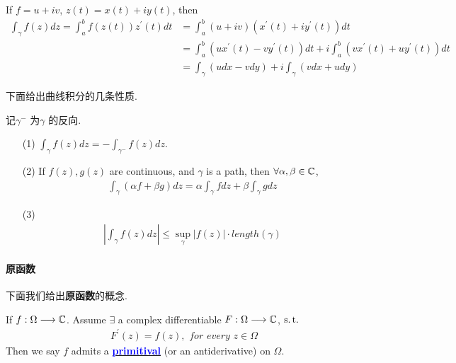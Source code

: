 	\vspace{2em}
	If $f = u + i v$, $z(t) = x(t) + i y(t)$, then
	\begin{align}
		\int_{\gamma}{f(z) dz} 
		= \int_{a}^{b}{f(z(t)) z^{'}(t) dt} 
		&= \int_{a}^{b}{(u + iv)(x^{'}(t) + i y^{'}(t)) dt} \\
		&= \int_{a}^{b}{(ux^{'}(t) - vy^{'}(t)) dt} + i \int_{a}^{b}{(vx^{'}(t) + uy^{'}(t)) dt} \\
		&= \int_{\gamma}{(udx - vdy)} + i \int_{\gamma}{(vdx + udy)}
	\end{align}

	\vspace{2em}
	下面给出曲线积分的几条性质.
	\begin{proposition}\label{prop 4.1.2}
		记$\gamma^{-}$ 为$\gamma$ 的反向.
		\begin{enumerate}
			\item[(1)]$\int_{\gamma}{f(z) dz} = -\int_{\gamma^{-}}{f(z) dz}$.
			
			\item[(2)]If $f(z) , g(z)$ are continuous, and $\gamma$ is a path, then $\forall \alpha , \beta \in \mathbb{C}$,
			\begin{align}
				\int_{\gamma}{(\alpha f + \beta g) dz} = \alpha \int_{\gamma}{f dz} + \beta \int_{\gamma}{g dz}
			\end{align}
		
			\item[(3)]
			\begin{align}
				\left| \int_{\gamma}{f(z) dz} \right| \leq \sup_{\gamma}{\left| f(z) \right|} \cdot length(\gamma)
			\end{align}
		\end{enumerate}
	\end{proposition}

\newpage
\paragraph{原函数}
	下面我们给出\textbf{原函数}的概念.
	\begin{defn}\label{def 4.1.4}
		If $f : \Omega \longrightarrow \mathbb{C}$. Assume $\exists$ a complex differentiable $F : \Omega \longrightarrow \mathbb{C}$, $\operatorname{s.t.}$
		\begin{align}
			F^{'}(z) = f(z) , \,\, for \,\, every \,\, z \in \Omega
		\end{align}
		Then we say $f$ admits a \underline{\textcolor{blue}{\textbf{primitival}}} (or an antiderivative) on $\Omega$.
	\end{defn}

